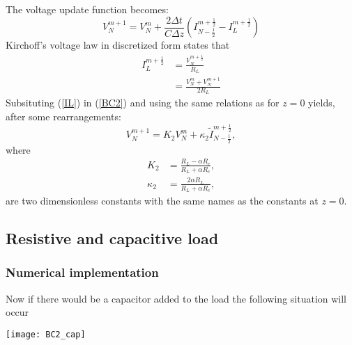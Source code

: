 \begin{itemize}
    The voltage update function becomes:
    \begin{equation}
        V^{m+1}_{N} = V^{m}_{N} + \frac{2\Delta t}{C\Delta z}\left(I^{m+\frac{1}{2}}_{N-\frac{1}{2}} - I^{m+\frac{1}{2}}_{L}\right)
        \label{BC2}
    \end{equation}
    Kirchoff's voltage law in discretized form states that
    \begin{align}
        I^{m+\frac{1}{2}}_{L} & = \frac{V^{m+\frac{1}{2}}_{N}}{R_{L}}\\
        & = \frac{V^{m}_{N}+V^{m+1}_{N}}{2R_{L}}
        \label{IL}
    \end{align}
    Subsituting (\ref{IL}) in (\ref{BC2}) and using the same relations as for $z=0$ yields, 
    after some rearrangements:
    \begin{equation}
        V^{m+1}_{N} = K_{2}V^{m}_N + \kappa_{2}\tilde{I}^{m+\frac{1}{2}}_{N-\frac{1}{2}},
    \end{equation}
    where
    \begin{align}
        K_{2} & = \frac{R_{L}-\alpha R_{c}}{R_{L}+\alpha R_{c}},\\
        \kappa_{2} & = \frac{2\alpha R_{L}}{R_{L}+\alpha R_{c}},
    \end{align}
    are two dimensionless constants with the same names as the constants at $z=0$.

\end{itemize}

\subsection{Resistive and capacitive load}

\subsubsection{Numerical implementation}

Now if there would be a capacitor added to the load the following situation will occur
    
\begin{center}
\texttt{[image: BC2\_cap]}
\end{center}

